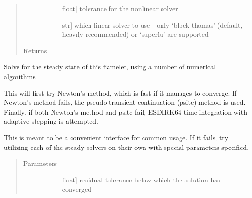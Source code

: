 \documentclass[letterpaper,10pt,english]{sphinxmanual}
\begin{document}
\begin{fulllineitems}
\begin{fulllineitems}
\begin{quote}
\begin{description}
\begin{description}
\item[{}] \leavevmode{[}float{]}
tolerance for the nonlinear solver

\item[{}] \leavevmode{[}str{]}
which linear solver to use - only ‘block thomas’ (default, heavily recommended) or ‘superlu’ are supported

\end{description}

\item[{Returns}] \leavevmode\begin{description}
\item[{}] \leavevmode
\end{description}

\end{description}\end{quote}

\end{fulllineitems}


\begin{fulllineitems}
\label{\detokenize{spitfire.chemistry.flamelet:spitfire.chemistry.flamelet.Flamelet.compute_steady_state}}
Solve for the steady state of this flamelet, using a number of numerical algorithms

This will first try Newton’s method, which is fast if it manages to converge.
If Newton’s method fails, the pseudo-transient continuation (psitc) method is used.
Finally, if both Newton’s method and psitc fail, ESDIRK64 time integration with adaptive stepping is attempted.

This is meant to be a convenient interface for common usage.
If it fails, try utilizing each of the steady solvers on their own with special parameters specified.
\begin{quote}\begin{description}
\item[{Parameters}] \leavevmode\begin{description}
\item[{}] \leavevmode{[}float{]}
residual tolerance below which the solution has converged


\end{description}
\end{description}
\end{quote}
\end{fulllineitems}
\end{fulllineitems}
\end{document}
